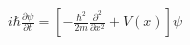 \documentclass[preview]{standalone}
\begin{document}
\begin{align*}
i\hbar\frac{\partial\psi}{\partial t} = \left[-\frac{\hbar^2}{2m}\frac{\partial^2}{\partial x^2}+V(x)\right]\psi
\end{align*}
\end{document}
